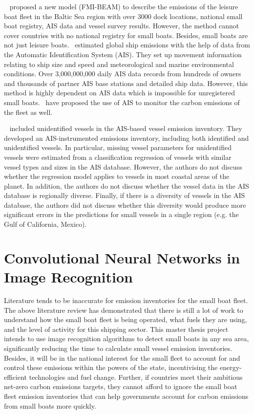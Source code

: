 ~ proposed a new model (FMI-BEAM) to describe the emissions of the leisure boat fleet in the Baltic Sea region with over 3000 dock locations, national small boat registry, AIS data and vessel survey results. However, the method cannot cover countries with no national registry for small boats. Besides, small boats are not just leisure boats.~ estimated global ship emissions with the help of data from the Automatic Identification System (AIS). They set up movement information relating to ship size and speed and meteorological and marine environmental conditions. Over 3,000,000,000 daily AIS data records from hundreds of owners and thousands of partner AIS base stations and detailed ship data. However, this method is highly dependent on AIS data which is impossible for unregistered small boats.~ have proposed the use of AIS to monitor the carbon emissions of the fleet as well.

~ included unidentified vessels in the AIS-based vessel emission inventory. They developed an AIS-instrumented emissions inventory, including both identified and unidentified vessels. In particular, missing vessel parameters for unidentified vessels were estimated from a classification regression of vessels with similar vessel types and sizes in the AIS database. However, the authors do not discuss whether the regression model applies to vessels in most coastal areas of the planet. In addition, the authors do not discuss whether the vessel data in the AIS database is regionally diverse. Finally, if there is a diversity of vessels in the AIS database, the authors did not discuss whether this diversity would produce more significant errors in the predictions for small vessels in a single region (e.g. the Gulf of California, Mexico).




\newpage
\section{Convolutional Neural Networks in Image Recognition}
\label{sec2.2}
Literature tends to be inaccurate for emission inventories for the small boat fleet. The above literature review has demonstrated that there is still a lot of work to understand how the small boat fleet is being operated, what fuels they are using, and the level of activity for this shipping sector. This master thesis project intends to use image recognition algorithms to detect small boats in any sea area, significantly reducing the time to calculate small vessel emission inventories. Besides, it will be in the national interest for the small fleet to account for and control these emissions within the powers of the state, incentivising the energy-efficient technologies and fuel change. Further, if countries meet their ambitious net-zero carbon emissions targets, they cannot afford to ignore the small boat fleet emission inventories that can help governments account for carbon emissions from small boats more quickly.


